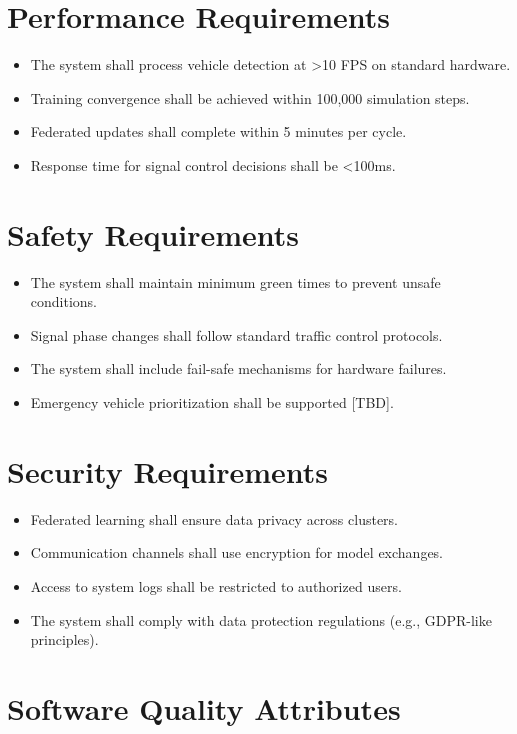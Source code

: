 \section{Performance Requirements}

\begin{itemize}
\item The system shall process vehicle detection at >10 FPS on standard hardware.
\item Training convergence shall be achieved within 100,000 simulation steps.
\item Federated updates shall complete within 5 minutes per cycle.
\item Response time for signal control decisions shall be <100ms.
\end{itemize}

\section{Safety Requirements}

\begin{itemize}
\item The system shall maintain minimum green times to prevent unsafe conditions.
\item Signal phase changes shall follow standard traffic control protocols.
\item The system shall include fail-safe mechanisms for hardware failures.
\item Emergency vehicle prioritization shall be supported [TBD].
\end{itemize}

\section{Security Requirements}

\begin{itemize}
\item Federated learning shall ensure data privacy across clusters.
\item Communication channels shall use encryption for model exchanges.
\item Access to system logs shall be restricted to authorized users.
\item The system shall comply with data protection regulations (e.g., GDPR-like principles).
\end{itemize}

\section{Software Quality Attributes}

